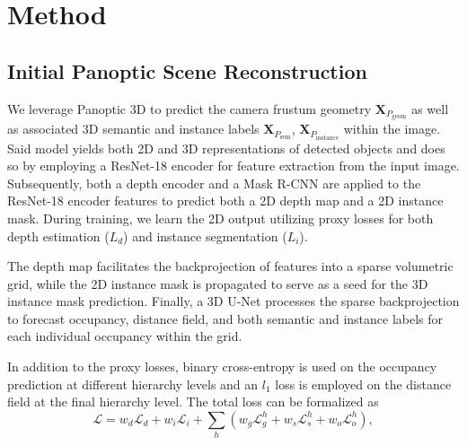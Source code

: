 \section{Method}
\label{sec:method}

\subsection{Initial Panoptic Scene Reconstruction}

We leverage Panoptic 3D \citep{dahnert2021panoptic} to predict the camera frustum geometry $\mathbf{X}_{P_{\text{geom}}}$ as well as associated 3D
semantic and instance labels $\mathbf{X}_{P_{\text{sem}}}$, $\mathbf{X}_{P_{\text{instance}}}$  within the image. Said model yields both 2D and 3D representations of detected objects and
does so by employing a ResNet-18 \citep{he2016deep} encoder for feature extraction from the input image. Subsequently,
both a depth encoder and a Mask R-CNN \citep{he2017mask} are applied to the ResNet-18 encoder features to predict both a 2D depth map
and a 2D instance mask.
During training, we learn the 2D output utilizing proxy losses for both depth estimation ($L_d$) and instance segmentation ($L_i$).


The depth map facilitates the backprojection of features into a sparse volumetric grid, while the 2D instance mask is propagated to serve as a seed for the 3D instance mask prediction. Finally, a 3D U-Net \citep{cciccek20163d} processes the sparse backprojection to forecast occupancy, distance field, and both semantic and instance labels for each individual occupancy within the grid.

In addition to the proxy losses, binary cross-entropy is used on the occupancy prediction at different hierarchy levels and an $l_1$ loss is employed on the distance field at the final hierarchy level.
The total loss can be formalized as 
\begin{equation}
    \mathcal{L} = w_d \mathcal{L}_d + w_i \mathcal{L}_i + \sum_h (w_g \mathcal{L}_g^h + w_s \mathcal{L}_s^h + w_o \mathcal{L}_o^h),
\end{equation}

